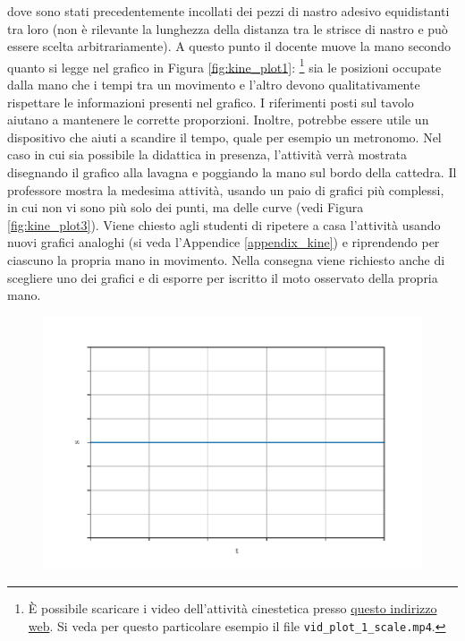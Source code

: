 \documentclass{report} \usepackage[T1]{fontenc} \usepackage[italian]{babel}
\begin{document}
dove sono stati precedentemente incollati dei pezzi di nastro adesivo
equidistanti tra loro (non è rilevante la lunghezza della distanza
tra le strisce di nastro e può essere scelta arbitrariamente). A questo
punto il docente muove la mano secondo quanto
si legge nel grafico in Figura \ref{fig:kine_plot1}:
\footnote{\`E possibile scaricare i video dell'attività cinestetica presso
            \textcolor{blue}{\href{https://github.com/savaroskij/PED1/tree/master/progetto_finale/media/video/kine_videos_1}{questo indirizzo web}}.
            Si veda per questo particolare esempio il file \texttt{vid\_plot\_1\_scale.mp4}.
         }
sia le posizioni occupate dalla
mano che i tempi tra un movimento e l’altro devono qualitativamente
rispettare le informazioni presenti nel grafico. I riferimenti posti sul tavolo
aiutano a mantenere le corrette proporzioni. Inoltre, potrebbe essere utile un
dispositivo che aiuti a scandire il tempo, quale per esempio un metronomo. Nel
caso in cui sia possibile la didattica in presenza, l’attività verrà mostrata
disegnando il grafico alla lavagna e poggiando la mano sul bordo della
cattedra. Il professore mostra la medesima attività, usando un paio di grafici
più complessi, in cui non vi sono più solo dei punti, ma delle curve (vedi Figura
\ref{fig:kine_plot3}).
Viene chiesto agli studenti di ripetere a casa l’attività usando
nuovi grafici analoghi (si veda l'Appendice \ref{appendix_kine}) e riprendendo
per ciascuno la propria mano in movimento.
Nella consegna viene richiesto anche
di scegliere uno dei grafici e di esporre per iscritto il moto osservato della
propria mano.

\begin{figure}[H]
\centering
  \includegraphics[width=\textwidth]{kine_plot2}
  \label{fig:kine_plot2}
\end{figure}
\end{document}
